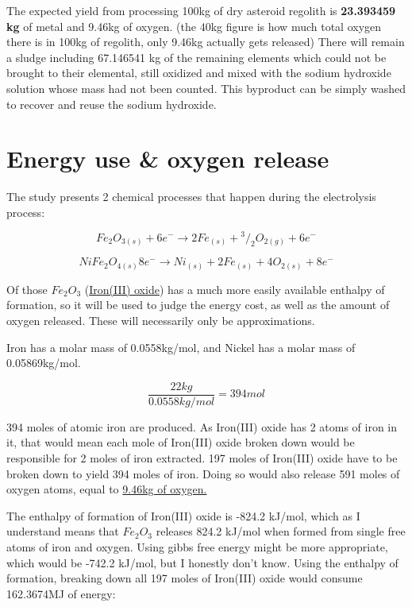 \documentclass[a4paper]{article}
\begin{document}
    The expected yield from processing 100kg of dry asteroid regolith is \textbf{23.393459 kg} of metal and 9.46kg of oxygen.
    (the 40kg figure is how much total oxygen there is in 100kg of regolith, only 9.46kg actually gets released)
    There will remain a sludge including 67.146541 kg of the remaining elements which could not be brought to their elemental, still oxidized and mixed with the sodium hydroxide solution whose mass had not been counted.
    This byproduct can be simply washed to recover and reuse the sodium hydroxide.
    
    \pagebreak
    
    \section{Energy use \& oxygen release}
    
    The study presents 2 chemical processes that happen during the electrolysis process:
    
    $$ Fe_2O_{3(s)} + 6e^- \rightarrow 2Fe_{(s)} + {^3/_2} O_{2(g)} + 6e^- $$
    
    $$ NiFe_2O_{4(s)} 8e^- \rightarrow Ni_{(s)} + 2Fe_{(s)} + 4O_{2(s)} + 8e^-$$
    
    Of those $Fe_2O_3$ (\href{https://en.wikipedia.org/wiki/Iron(III)_oxide}{Iron(III) oxide}) has a much more easily available enthalpy of formation, so it will be used to judge the energy cost, as well as the amount of oxygen released.
    These will necessarily only be approximations.
    
    Iron has a molar mass of 0.0558kg/mol, and Nickel has a molar mass of 0.05869kg/mol.
    
    $$ \frac{22kg}{0.0558kg/mol} = 394 mol $$
    
    394 moles of atomic iron are produced.
    As Iron(III) oxide has 2 atoms of iron in it, that would mean each mole of Iron(III) oxide broken down would be responsible for 2 moles of iron extracted.
    197 moles of Iron(III) oxide have to be broken down to yield 394 moles of iron.
    Doing so would also release 591 moles of oxygen atoms, equal to \underline{9.46kg of oxygen.}
    
    \medskip
    
    The enthalpy of formation of Iron(III) oxide is -824.2 kJ/mol, which as I understand means that $Fe_2O_3$ releases 824.2 kJ/mol when formed from single free atoms of iron and oxygen.
    Using gibbs free energy might be more appropriate, which would be -742.2 kJ/mol, but I honestly don't know.
    Using the enthalpy of formation, breaking down all 197 moles of Iron(III) oxide would consume 162.3674MJ of energy:
    
\end{document}
